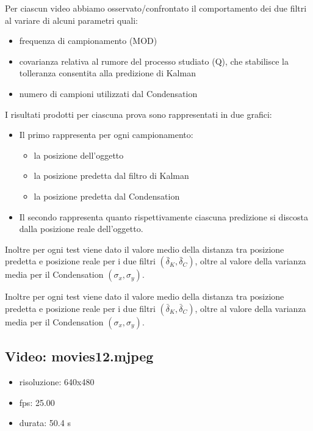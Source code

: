 Per ciascun video abbiamo osservato/confrontato il comportamento dei due filtri al variare di alcuni parametri quali:
\begin{itemize}
\item frequenza di campionamento (MOD)
\item covarianza relativa al rumore del processo studiato (Q), che stabilisce la tolleranza consentita alla predizione di Kalman
\item numero di campioni utilizzati dal Condensation\\
\end{itemize}

I risultati prodotti per ciascuna prova sono rappresentati in due grafici:
\begin{itemize}
\item Il primo rappresenta per ogni campionamento:
\begin{itemize}
\item la posizione dell'oggetto
\item la posizione predetta dal filtro di Kalman
\item la posizione predetta dal Condensation
\end{itemize}
\item Il secondo rappresenta quanto rispettivamente ciascuna predizione si discosta dalla posizione reale dell'oggetto.
\end{itemize}

Inoltre per ogni test viene dato il valore medio della distanza tra posizione predetta e posizione reale per i due filtri \begin{math}(\bar \delta_K, \bar \delta_C)\end{math}, oltre al valore della varianza media per il Condensation \begin{math}(\sigma_x,\sigma_y)\end{math}.


Inoltre per ogni test viene dato il valore medio della distanza tra posizione predetta e posizione reale per i due filtri \begin{math}(\bar \delta_K, \bar \delta_C)\end{math}, oltre al valore della varianza media per il Condensation \begin{math}(\sigma_x,\sigma_y)\end{math}.


\newpage

\subsection{Video: movies12.mjpeg}
\begin{itemize}
\item risoluzione: 640x480
\item fps: 25.00
\item durata: 50.4 s
\end{itemize}


